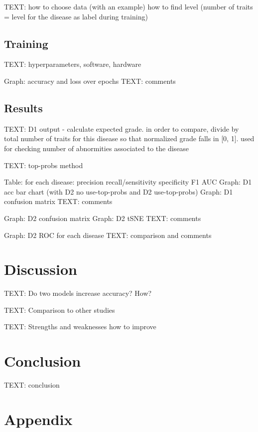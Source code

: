 \documentclass{article}
\begin{document}
			TEXT: how to choose data (with an example)
			how to find level (number of traits = level for the disease as label during training)
			
		
		\subsection{Training}
			
			TEXT: hyperparameters, software, hardware
			
			Graph: accuracy and loss over epochs
			TEXT: comments
				
				
		\subsection{Results}
			
			TEXT: D1 output - calculate expected grade. in order to compare, divide by total number of traits for this disease so that normalized grade falls in [0, 1]. 
			used for checking number of abnormities associated to the disease
			
			TEXT: top-probs method
			
			Table: for each disease:
				precision
				recall/sensitivity
				specificity
				F1
				AUC
			Graph: D1 acc bar chart (with D2 no use-top-probs and D2 use-top-probs)
			Graph: D1 confusion matrix
			TEXT: comments
			
			Graph: D2 confusion matrix
			Graph: D2 tSNE
			TEXT: comments
			
			Graph: D2 ROC for each disease
			TEXT: comparison and comments
	
	\section{Discussion}
		
		TEXT: Do two models increase accuracy? How?
		
		TEXT: Comparison to other studies
		
		TEXT: Strengths and weaknesses
		how to improve
		
	\section{Conclusion}
	
		TEXT: conclusion

	\newrefcontext[sorting=nyt]
	\printbibliography
	
	\pagebreak
	\section*{Appendix}
	
\end{document}

